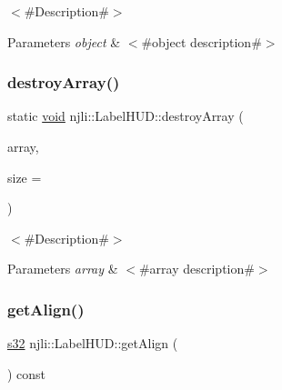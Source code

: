 $<$\#\+Description\#$>$


\begin{DoxyParams}{Parameters}
{\em object} & $<$\#object description\#$>$ \\
\hline
\end{DoxyParams}
\mbox{\label{classnjli_1_1_label_h_u_d_a733dac9e1b004210e1cc25b879a1ff26}} 
\subsubsection{\texorpdfstring{destroy\+Array()}{destroyArray()}}
{\footnotesize\ttfamily static \mbox{\hyperlink{_thread_8h_af1e856da2e658414cb2456cb6f7ebc66}{void}} njli\+::\+Label\+H\+U\+D\+::destroy\+Array (\begin{DoxyParamCaption}\item[{\mbox{\hyperlink{classnjli_1_1_label_h_u_d}{Label\+H\+UD}} $\ast$$\ast$}]{array,  }\item[{const \mbox{\hyperlink{_util_8h_a10e94b422ef0c20dcdec20d31a1f5049}{u32}}}]{size = {} }\end{DoxyParamCaption})\hspace{0.3cm}{\ttfamily [static]}}

$<$\#\+Description\#$>$


\begin{DoxyParams}{Parameters}
{\em array} & $<$\#array description\#$>$ \\
\hline
\end{DoxyParams}
\mbox{\label{classnjli_1_1_label_h_u_d_a970d0a47b794659a5e1c3b58e07c239e}} 
\subsubsection{\texorpdfstring{get\+Align()}{getAlign()}}
{\footnotesize\ttfamily \mbox{\hyperlink{_util_8h_aa62c75d314a0d1f37f79c4b73b2292e2}{s32}} njli\+::\+Label\+H\+U\+D\+::get\+Align (\begin{DoxyParamCaption}{ }\end{DoxyParamCaption}) const}


